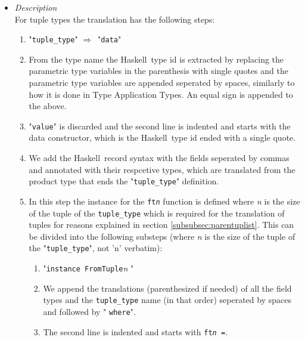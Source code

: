\documentclass{article}
\def\H{Haskell}
\def\lra{$\Longrightarrow$\ }
\begin{document}
\begin{itemize}
\begin{verbatim}
c0root :: a1 -> A'Tree a1 -> A'Tree a1
c0subtrees :: A'Trees a1 -> A'Tree a1 -> A'Tree a1
c0root = \new x -> x { root = new }
c0subtrees = \new x -> x { subtrees = new }
\end{verbatim}
\item
\textit{Description}\\

For tuple types the translation has the following steps:

\begin{enumerate}

\item
"\verb|tuple_type|" \lra "\texttt{data}"

\item
From the type name the \H\ type id is extracted by replacing the parametric
type variables in the parenthesis with single quotes and the parametric type
variables are appended seperated by spaces, similarly to how it is done in Type
Application Types. An equal sign is appended to the above.

\item
"\texttt{value}" is discarded and the second line is indented and starts
with the data constructor, which is the \H\ type id ended with a single quote.

\item
We add the \H\ record syntax with the fields seperated by commas and annotated
with their respcetive types, which are translated from the product type that
ends the "\verb|tuple_type|" definition.

\item
In this step the instance for the \texttt{ft\textit{n}} function is defined
where \textit{n} is the size of the tuple of the \verb|tuple_type| which is
required for the translation of tuples for reasons explained in section
\ref{subsubsec:parentuplist}. This can be divided into the following substeps
(where \textit{n} is the size of the tuple of the "\verb|tuple_type|", not
'n' verbatim):

\begin{enumerate}
\item
"\texttt{instance FromTuple}\textit{n} "

\item
We append the translations (parenthesized if needed) of all the field types and
the \verb|tuple_type| name (in that order) seperated by spaces and followed
by " \texttt{where}".

\item
The second line is indented and starts with \texttt{ft\textit{n} =}.


\end{enumerate}
\end{enumerate}
\end{itemize}
\end{document}
